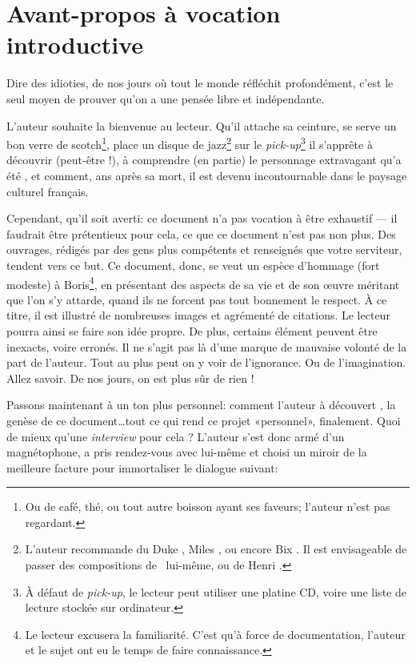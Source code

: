 \frontmatter

\chapter{Avant-propos à vocation introductive}
\epigraph{Dire des idioties, de nos jours où tout le monde réfléchit profondément, c'est le seul moyen de prouver qu'on a une pensée libre et indépendante.}{\BV}
\vfill
\pagebreak

L'auteur souhaite la bienvenue au lecteur. Qu'il attache sa ceinture,
se serve un bon verre de scotch\footnote{Ou de café, thé, ou tout autre
boisson ayant ses faveurs; l'auteur n'est pas regardant.}, place un
disque de jazz\footnote{L'auteur recommande du Duke , 
Miles , ou encore Bix . Il est envisageable de
passer des compositions de \BV\ lui-même, ou de Henri .}
sur le \emph{pick-up}\footnote{À défaut de \emph{pick-up},
le lecteur peut utiliser une platine CD, voire une liste de lecture
stockée sur ordinateur.}
il s'apprête à découvrir (peut-être !), à comprendre (en partie) le
personnage extravagant qu'a été \BV, et comment,  ans après
sa mort, il est devenu incontournable dans le paysage culturel français.

Cependant, qu'il soit averti: ce document n'a pas vocation à être exhaustif
--- il faudrait être prétentieux pour cela, ce que ce document n'est pas
non plus. Des ouvrages, rédigés par des gens plus compétents et renseignés
que votre serviteur, tendent vers ce but.
Ce document, donc, se veut un espèce d'hommage (fort modeste) à
Boris\footnote{Le lecteur excusera la familiarité. C'est qu'à force de
documentation, l'auteur et le sujet ont eu le temps de faire connaissance.},
en présentant des aspects de sa vie et de son \oe{}uvre méritant
que l'on s'y attarde, quand ils ne forcent pas tout bonnement le respect.
À ce titre, il est illustré de nombreuses images et agrémenté
de citations. Le lecteur pourra ainsi se faire son idée propre. De plus, 
certains élément peuvent être inexacts, voire erronés. Il ne
s'agit pas là d'une marque de mauvaise volonté de la part de l'auteur. Tout
au plus peut on y voir de l'ignorance. Ou de l'imagination. Allez savoir.
De nos jours, on est plus sûr de rien !


Passons maintenant à un ton plus personnel: comment l'auteur à
 découvert \BV, la genèse de ce document\ldots tout ce qui rend ce projet «personnel», finalement.
Quoi de mieux qu'une \emph{interview} pour cela ?
L'auteur s'est donc armé d'un magnétophone, a pris rendez-vous avec lui-même
et choisi un miroir de la meilleure facture pour immortaliser le dialogue suivant:

